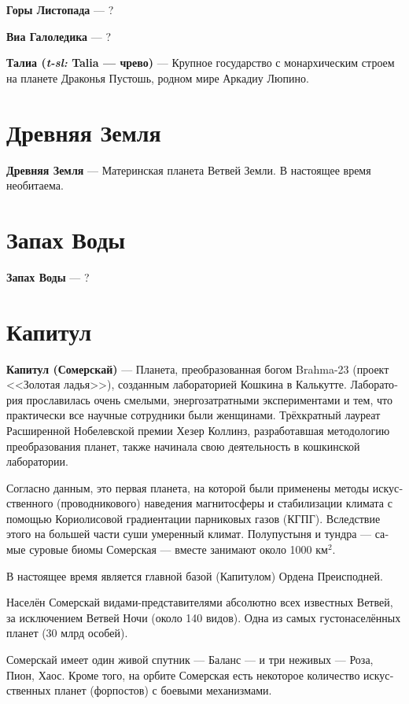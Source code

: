\documentclass[a4paper,12pt,fleqn]{book}\usepackage{polyglossia}\setdefaultlanguage[babelshorthands=true]{russian}\setotherlanguage{english}\defaultfontfeatures{Ligatures=TeX,Mapping=tex-text}\usepackage{xcolor}\newcommand{\ml}[3]{#2}
\newcommand{\asterism}{\vspace{1em}{\centering\Large\bfseries$\ast~\ast~\ast$\par}\vspace{1em}}
\newcommand{\theterm}[3]{\textbf{\hypertarget{#1}{#2}} --- #3}
\newcommand{\theorigin}[3]{\textit{#1:} #2 --- #3}
\begin{document}
\asterism

\theterm{dropleaf-mountains}
{Горы Листопада}
{?}

\theterm{via-galoledica}
{Виа Галоледика}
{?}

\theterm{talia}
{Талиа (\theorigin{t-sl}{Talia}{чрево})}
{Крупное государство с монархическим строем на планете Драконья Пустошь, родном мире Аркадиу Люпино.}

\section{Древняя Земля}

\theterm{old-earth}
{Древняя Земля}
{Материнская планета Ветвей Земли.
В настоящее время необитаема.}

\section{Запах Воды}

\theterm{smellwater}
{Запах Воды}
{?}

\section{Капитул}

\theterm{capitul}
{Капитул (Сомерскай)}
{Планета, преобразованная богом Brahma-23 (проект <<Золотая ладья>>), созданным лабораторией Кошкина в Калькутте.
Лаборатория прославилась очень смелыми, энергозатратными экспериментами и тем, что практически все научные сотрудники были женщинами.
Трёхкратный лауреат Расширенной Нобелевской премии Хезер Коллинз, разработавшая методологию преобразования планет, также начинала свою деятельность в кошкинской лаборатории.

Согласно данным, это первая планета, на которой были применены методы искусственного (проводникового) наведения магнитосферы и стабилизации климата с помощью Кориолисовой градиентации парниковых газов (КГПГ).
Вследствие этого на большей части суши умеренный климат.
Полупустыня и тундра --- самые суровые биомы Сомерская --- вместе занимают около 1000 км$^2$.

В настоящее время является главной базой (Капитулом) Ордена Преисподней.

Населён Сомерскай видами-представителями абсолютно всех известных Ветвей, за исключением Ветвей Ночи (около 140 видов).
Одна из самых густонаселённых планет (30 млрд особей).

Сомерскай имеет один живой спутник --- Баланс --- и три неживых --- Роза, Пион, Хаос.
Кроме того, на орбите Сомерская есть некоторое количество искусственных планет (форпостов) с боевыми механизмами.}
\end{document}
